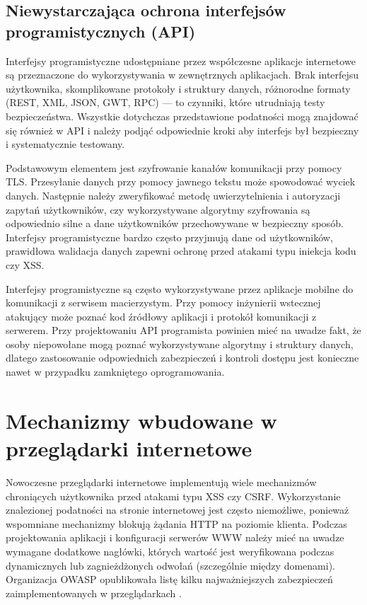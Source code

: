 \documentclass[11pt,a4paper,polish,thesis]{dcsbook}
\begin{document}
\subsection{Niewystarczająca ochrona interfejsów programistycznych (API)}
Interfejsy programistyczne udostępniane przez współczesne aplikacje internetowe są przeznaczone do wykorzystywania w zewnętrznych aplikacjach. Brak interfejsu użytkownika, skomplikowane protokoły i struktury danych, różnorodne formaty (REST, XML, JSON, GWT, RPC) --- to czynniki, które utrudniają testy bezpieczeństwa. Wszystkie dotychczas przedstawione podatności mogą znajdować się również w API i należy podjąć odpowiednie kroki aby interfejs był bezpieczny i systematycznie testowany.

Podstawowym elementem jest szyfrowanie kanałów komunikacji przy pomocy TLS. Przesyłanie danych przy pomocy jawnego tekstu może spowodować wyciek danych. Następnie należy zweryfikować metodę uwierzytelnienia i autoryzacji zapytań użytkowników, czy wykorzystywane algorytmy szyfrowania są odpowiednio silne a dane użytkowników przechowywane w bezpieczny sposób. Interfejsy programistyczne bardzo często przyjmują dane od użytkowników, prawidłowa walidacja danych zapewni ochronę przed atakami typu iniekcja kodu czy XSS.

Interfejsy programistyczne są często wykorzystywane przez aplikacje mobilne do komunikacji z serwisem macierzystym. Przy pomocy inżynierii wstecznej atakujący może poznać kod źródłowy aplikacji i protokół komunikacji z serwerem. Przy projektowaniu API programista powinien mieć na uwadze fakt, że osoby niepowołane mogą poznać wykorzystywane algorytmy i struktury danych, dlatego zastosowanie odpowiednich zabezpieczeń i kontroli dostępu jest konieczne nawet w przypadku zamkniętego oprogramowania.

\section{Mechanizmy wbudowane w przeglądarki internetowe}
Nowoczesne przeglądarki internetowe implementują wiele mechanizmów chroniących użytkownika przed atakami typu XSS czy CSRF. Wykorzystanie znalezionej podatności na stronie internetowej jest często niemożliwe, ponieważ wspomniane mechanizmy blokują żądania HTTP na poziomie klienta. Podczas projektowania aplikacji i konfiguracji serwerów WWW należy mieć na uwadze wymagane dodatkowe nagłówki, których wartość jest weryfikowana podczas dynamicznych lub zagnieżdżonych odwołań (szczególnie między domenami). Organizacja OWASP opublikowała listę kilku najważniejszych zabezpieczeń zaimplementowanych w przeglądarkach \cite{html5security}.
\end{document}
